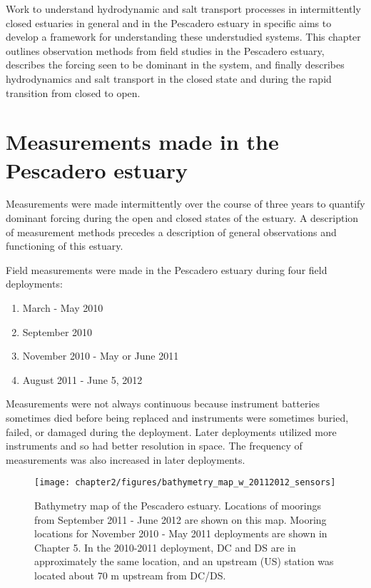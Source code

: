 Work to understand hydrodynamic and salt transport processes in intermittently closed estuaries in general and in the Pescadero estuary in specific aims to develop a framework for understanding these understudied systems. This chapter outlines observation methods from field studies in the Pescadero estuary, describes the forcing seen to be dominant in the system, and finally describes hydrodynamics and salt transport in the closed state and during the rapid transition from closed to open. 

\section{Measurements made in the Pescadero estuary} \label{measurementslabel}

Measurements were made intermittently over the course of three years to quantify dominant forcing during the open and closed states of the estuary. A description of measurement methods precedes a description of general observations and functioning of this estuary.

Field measurements were made in the Pescadero estuary during four field deployments:

\begin{enumerate}
	\item March - May 2010 
	\item September 2010 
	\item November 2010 - May or June 2011 
	\item August 2011 - June 5, 2012
\end{enumerate}

 Measurements were not always continuous because instrument batteries sometimes died before being replaced and instruments were sometimes buried, failed, or damaged during the deployment. Later deployments utilized more instruments and so had better resolution in space.  The frequency of measurements was also increased in later deployments. 

\begin{figure}
\centering
	\texttt{[image: chapter2/figures/bathymetry\_map\_w\_20112012\_sensors]} \caption{Bathymetry map of the Pescadero estuary. Locations of moorings from September 2011 - June 2012 are shown on this map. Mooring locations for November 2010 - May 2011 deployments are shown in Chapter 5. In the 2010-2011 deployment, DC and DS are in approximately the same location, and an upstream (US) station was located about 70 m upstream from DC/DS.}\label{fig:BathyCh2}
\end{figure}

